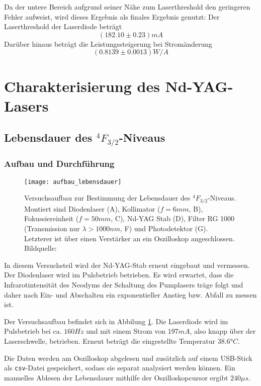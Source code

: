 \documentclass{../Misc/MontavonLaTeX/Montavon}
\newcommand{\fullwidth}{1.0\textwidth}
\begin{document}
Da der untere Bereich aufgrund seiner Nähe zum Laserthreshold den geringeren Fehler aufweist, wird dieses Ergebnis als finales Ergebnis genutzt:
Der Laserthreshold der Laserdiode beträgt 
\[ (182.10 \pm 0.23) \unit{mA} \]
Darüber hinaus beträgt die Leistungssteigerung bei Stromänderung
\[ (0.8139 \pm 0.0013) \unit{W/A} \]


\section{Charakterisierung des Nd-YAG-Lasers}

\subsection{Lebensdauer des $^4F_{3/2}$-Niveaus}
\subsubsection{Aufbau und Durchführung}
\begin{figure}[htbp]
\centering
\texttt{[image: aufbau\_lebensdauer]}
\caption{Versuchsaufbau zur Bestimmung der Lebensdauer des $^4F_{3/2}$-Niveaus. Montiert sind Diodenlaser (A), Kollimator ($f = 6 \unit{mm}$, B), Fokussiereinheit ($f = 50 \unit{mm}$, C), Nd-YAG Stab (D), Filter RG 1000 (Transmission nur $\lambda > 1000 \unit{nm}$, F) und Photodetektor (G). Letzterer ist über einen Verstärker an ein Oszilloskop angeschlossen. Bildquelle: \cite[S. 35]{anleitung1}}
\label{fig:aufbau_lebensdauer}
\end{figure}

In diesem Versuchsteil wird der Nd-YAG-Stab erneut eingebaut und vermessen. Der Diodenlaser wird im Pulsbetrieb betrieben. Es wird erwartet, dass die Infrarotintensität des Neodyms der Schaltung des Pumplasers träge folgt und daher nach Ein- und Abschalten ein exponentieller Anstieg bzw. Abfall zu messen ist.

Der Versuchsaufbau befindet sich in Abbilung \ref{fig:aufbau_lebensdauer}. Die Laserdiode wird im Pulsbetrieb bei ca. $160 \unit{Hz}$ und mit einem Strom von $197 \unit{mA}$, also knapp über der Laserschwelle, betrieben. Erneut beträgt die eingestellte Temperatur $38.6 \unit{\degree C}$.

Die Daten werden am Oszilloskop abgelesen und zusätzlich auf einem USB-Stick als \texttt{csv}-Datei gespeichert, sodass sie separat analysiert werden können. Ein manuelles Ablesen der Lebensdauer mithilfe der Oszilloskopcursor ergibt $240 \unit{\mu s}$. 
\end{document}
